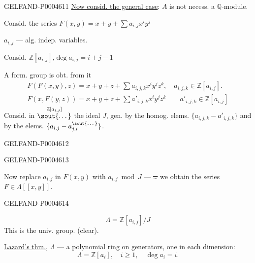 \begin{GelfandAdjacentEvidence}{GELFAND-P000461}{1}
\underline{Now consid. the general case}: $A$ is not necess. a $\mathbb Q$-module.

Consid. the series $F(x,y)=x+y+\sum a_{i,j}x^iy^j$

$a_{i,j}$ — alg. indep. variables.

Consid. $\mathbb Z[a_{i,j}]$,\quad $\deg a_{i,j}=i+j-1$

A form. group is obt. from it
\[
\begin{gathered}
F(F(x,y),z)=x+y+z+\sum a_{i,j,k}x^iy^jz^k,\quad
a_{i,j,k}\in\mathbb Z[a_{i,j}].\\
F(x,F(y,z))=x+y+z+\sum a'_{i,j,k}x^iy^jz^k
\qquad a'_{i,j,k}\in\mathbb Z[a_{i,j}]
\end{gathered}
\]
Consid. in $\overset{\mathbb Z[a_{i,j}]}{\text{\sout{\ldots}}}$ the ideal
$J$, gen. by the homog. elems. $\{a_{i,j,k}-a'_{i,j,k}\}$
and by the elems. $\{a_{i,j}-a_{j,i}^{\text{\sout{\ldots}}}\}$.
\end{GelfandAdjacentEvidence}
\begin{GelfandAdjacentEvidence}{GELFAND-P000461}{2}

\end{GelfandAdjacentEvidence}
\begin{GelfandAdjacentEvidence}{GELFAND-P000461}{3}


Now replace $a_{i,j}$ in $F(x,y)$ with $a_{i,j}\bmod J$ —
\sout{\ldots} we obtain the series $F\in\Lambda[[x,y]]$.
\end{GelfandAdjacentEvidence}
\begin{GelfandAdjacentEvidence}{GELFAND-P000461}{4}

\[
\Lambda=\mathbb Z[a_{i,j}]/J
\]
This is the univ. group. (clear).

\underline{Lazard’s thm.}, $\Lambda$ — a polynomial ring on generators, one in each dimension:
\[
\Lambda=\mathbb Z[a_i],\quad i\ge1,\quad\deg a_i=i.
\]
\end{GelfandAdjacentEvidence}
